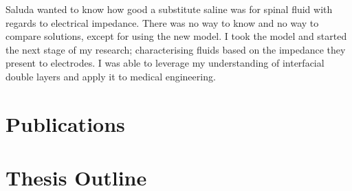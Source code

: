   Saluda wanted to know how good a substitute saline was for spinal fluid with regards to electrical impedance.
  There was no way to know and no way to compare solutions, except for using the new model.
  I took the model and started the next stage of my research; characterising fluids based on the impedance they present to electrodes.
  I was able to leverage my understanding of interfacial double layers and apply it to medical engineering.

\section{Publications}

\section{Thesis Outline}
